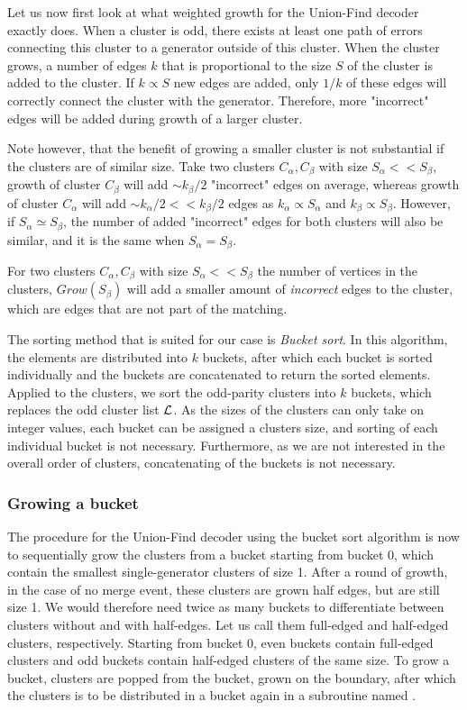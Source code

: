 Let us now first look at what weighted growth for the Union-Find decoder exactly does. When a cluster is odd, there exists at least one path of errors connecting this cluster to a generator outside of this cluster. When the cluster grows, a number of edges $k$ that is proportional to the size $S$ of the cluster is added to the cluster. If $k \propto S$ new edges are added, only $1/k$ of these edges will correctly connect the cluster with the generator. Therefore, more "incorrect" edges will be added during growth of a larger cluster.

Note however, that the benefit of growing a smaller cluster is not substantial if the clusters are of similar size. Take two clusters $C_\alpha, C_\beta$ with size $S_\alpha <<S_\beta$, growth of cluster $C_\beta$ will add $\sim k_{\beta}/2$ "incorrect" edges on average, whereas growth of cluster $C_\alpha$ will add $\sim k_{\alpha}/2 << k_{\beta}/2$ edges as $k_{\alpha} \propto S_\alpha$ and $k_{\beta} \propto S_\beta$. However, if $S_\alpha \simeq S_\beta$, the number of added "incorrect" edges for both clusters will also be similar, and it is the same when $S_\alpha = S_\beta$.

\begin{lemma}\label{lem:incorrectedges}
  For two clusters $C_\alpha, C_\beta$ with size $S_\alpha << S_\beta$ the number of vertices in the clusters, $Grow(S_\beta)$ will add a smaller amount of \emph{incorrect} edges to the cluster, which are edges that are not part of the matching.
\end{lemma}

The sorting method that is suited for our case is \emph{Bucket sort}. In this algorithm, the elements are distributed into $k$ buckets, after which each bucket is sorted individually and the buckets are concatenated to return the sorted elements. Applied to the clusters, we sort the odd-parity clusters into $k$ buckets, which replaces the odd cluster list $\mathcal{L}$. As the sizes of the clusters can only take on integer values, each bucket can be assigned a clusters size, and sorting of each individual bucket is not necessary. Furthermore, as we are not interested in the overall order of clusters, concatenating of the buckets is not necessary.


\subsubsection{Growing a bucket}
The procedure for the Union-Find decoder using the bucket sort algorithm is now to sequentially grow the clusters from a bucket starting from bucket 0, which contain the smallest single-generator clusters of size 1. After a round of growth, in the case of no merge event, these clusters are grown half edges, but are still size 1. We would therefore need twice as many buckets to differentiate between clusters without and with half-edges. Let us call them full-edged and half-edged clusters, respectively. Starting from bucket 0, even buckets contain full-edged clusters and odd buckets contain half-edged clusters of the same size. To grow a bucket, clusters are popped from the bucket, grown on the boundary, after which the clusters is to be distributed in a bucket again in a subroutine named .


